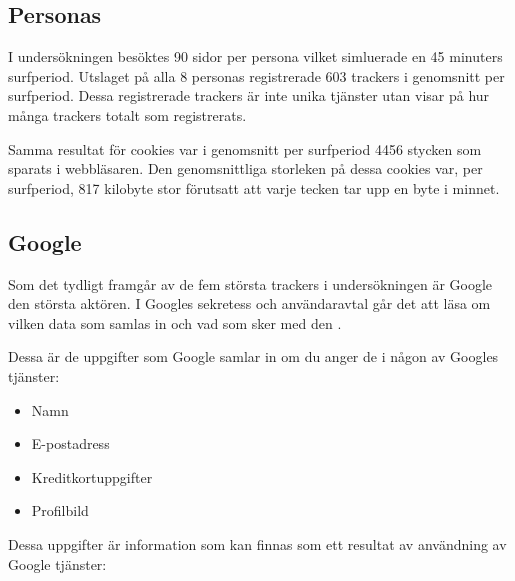 \documentclass[a4paper,11pt]{article}
\begin{document}
{\subsection{Personas}
I undersökningen besöktes 90 sidor per persona vilket simluerade en 45 minuters surfperiod. Utslaget på alla 8 personas registrerade 603 trackers i genomsnitt per surfperiod. Dessa registrerade trackers är inte unika tjänster utan visar på hur många trackers totalt som registrerats.

Samma resultat för cookies var i genomsnitt per surfperiod 4456 stycken som sparats i webbläsaren. Den genomsnittliga storleken på dessa cookies var, per surfperiod, 817 kilobyte stor förutsatt att varje tecken tar upp en byte i minnet.

\subsection{Google}
Som det tydligt framgår av de fem största trackers i undersökningen är Google den största aktören. I Googles sekretess och användaravtal går det att läsa om vilken data som samlas in och vad som sker med den \cite{GooglePrivacyPolicy}.

Dessa är de uppgifter som Google samlar in om du anger de i någon av Googles tjänster: 

\begin{itemize}
 \item Namn
 \item E-postadress
 \item Kreditkortuppgifter
 \item Profilbild
\end{itemize}


Dessa uppgifter är information som kan finnas som ett resultat av användning av Google tjänster: 

}
\end{document}
